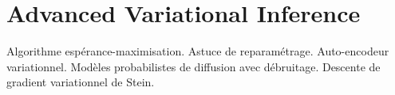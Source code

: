 \section{Advanced Variational Inference}

Algorithme espérance-maximisation. Astuce de reparamétrage. Auto-encodeur variationnel. Modèles probabilistes de diffusion avec débruitage. Descente de gradient variationnel de Stein.


